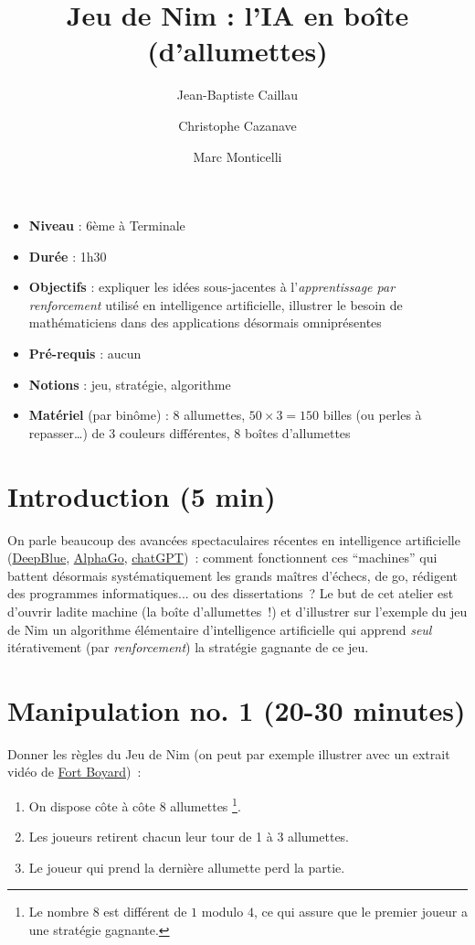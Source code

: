 \documentclass[a4paper,12pt]{article}
\title{\bf Jeu de Nim : l'IA en boîte (d'allumettes)}
\author{Jean-Baptiste Caillau}
\author{Christophe Cazanave}
\author{Marc Monticelli}
\affil{Université Côte d’Azur, CNRS, LJAD, France}
\date{}
\begin{document}
\maketitle
\label{jeu-de-nim-lia-en-boite-dallumettes}

\begin{itemize}
\item
  \textbf{Niveau} : 6ème à Terminale
\item
  \textbf{Durée} : 1h30
\item
  \textbf{Objectifs} : expliquer les idées sous-jacentes à l'\emph{apprentissage par renforcement} utilisé en intelligence artificielle, illustrer le besoin de mathématiciens dans des applications désormais omniprésentes
\item
  \textbf{Pré-requis} : aucun
\item
  \textbf{Notions} : jeu, stratégie, algorithme
\item
  \textbf{Matériel} (par binôme) : 8 allumettes, $50 \times 3 = 150$ billes (ou perles à repasser\ldots) de 3 couleurs différentes, 8 boîtes d'allumettes
\end{itemize}

\section{Introduction (5 min)} \label{introduction-5-min}
\noindent On parle beaucoup des avancées spectaculaires récentes en intelligence artificielle (\href{https://www.ibm.com/ibm/history/ibm100/us/en/icons/deepblue}{DeepBlue}, \href{https://www.deepmind.com/research/highlighted-research}{AlphaGo}, \href{https://openai.com/blog/chatgpt}{chatGPT})~: comment fonctionnent ces ``machines'' qui battent désormais systématiquement les grands maîtres d'échecs, de go, rédigent des programmes informatiques... ou des dissertations~? Le but de cet atelier est d'ouvrir ladite machine (la boîte d'allumettes~!) et d'illustrer sur l'exemple du jeu de Nim un algorithme élémentaire d'intelligence artificielle qui apprend \emph{seul} itérativement (par \emph{renforcement}) la stratégie gagnante de ce jeu.

\section{Manipulation no. 1 (20-30 minutes)} \label{manipulation-no.-1-20-30-minutes}
\noindent Donner les règles du Jeu de Nim (on peut par exemple illustrer avec un extrait vidéo de \href{https://fortboyard.tv}{Fort Boyard})~:
\begin{enumerate}
  \item On dispose côte à côte 8 allumettes \footnote{Le nombre \(8\) est différent de \(1\) modulo \(4\), ce qui assure que le premier joueur a une stratégie gagnante.}.
  \item Les joueurs retirent chacun leur tour de 1 à 3 allumettes.
  \item Le joueur qui prend la dernière allumette perd la partie.
\end{enumerate}
\end{document}
